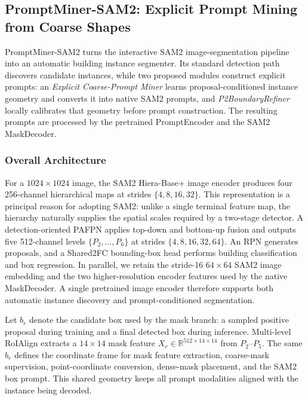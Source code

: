 \documentclass[letterpaper,journal]{IEEEtran}
\begin{document}
\subsection{PromptMiner-SAM2: Explicit Prompt Mining from Coarse Shapes}
\label{sec:single_method}

PromptMiner-SAM2 turns the interactive SAM2 image-segmentation pipeline into an automatic building instance segmenter. Its standard detection path discovers candidate instances, while two proposed modules construct explicit prompts: an \emph{Explicit Coarse-Prompt Miner} learns proposal-conditioned instance geometry and converts it into native SAM2 prompts, and \emph{P2BoundaryRefiner} locally calibrates that geometry before prompt construction. The resulting prompts are processed by the pretrained PromptEncoder and the SAM2 MaskDecoder.

\subsubsection{Overall Architecture}
For a $1024\times1024$ image, the SAM2 Hiera-Base+ image encoder produces four 256-channel hierarchical maps at strides $\{4,8,16,32\}$. This representation is a principal reason for adopting SAM2: unlike a single terminal feature map, the hierarchy naturally supplies the spatial scales required by a two-stage detector. A detection-oriented PAFPN applies top-down and bottom-up fusion and outputs five 512-channel levels $\{P_2,\ldots,P_6\}$ at strides $\{4,8,16,32,64\}$. An RPN generates proposals, and a Shared2FC bounding-box head performs building classification and box regression. In parallel, we retain the stride-16 $64\times64$ SAM2 image embedding and the two higher-resolution encoder features used by the native MaskDecoder. A single pretrained image encoder therefore supports both automatic instance discovery and prompt-conditioned segmentation.

Let $b_r$ denote the candidate box used by the mask branch: a sampled positive proposal during training and a final detected box during inference. Multi-level RoIAlign extracts a $14\times14$ mask feature $X_r\in\mathbb{R}^{512\times14\times14}$ from $P_2$--$P_5$. The same $b_r$ defines the coordinate frame for mask feature extraction, coarse-mask supervision, point-coordinate conversion, dense-mask placement, and the SAM2 box prompt. This shared geometry keeps all prompt modalities aligned with the instance being decoded.
\end{document}
